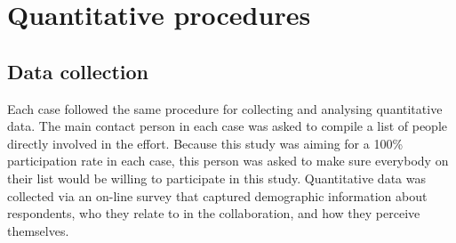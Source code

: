 \begin{table}[]
	\small
	\centering
	\caption{Key characteristics of the cases recruited for this study}
	\label{cases}
\end{table}

\section{Quantitative procedures}



\subsection{Data collection}

Each case followed the same procedure for collecting and analysing quantitative data. The main contact person in each case was asked to compile a list of people directly involved in the effort. Because this study was aiming for a 100\% participation rate in each case, this person was asked to make sure everybody on their list would be willing to participate in this study. Quantitative data was collected via an on-line survey that captured demographic information about respondents, who they relate to in the collaboration, and how they perceive themselves.\medskip

